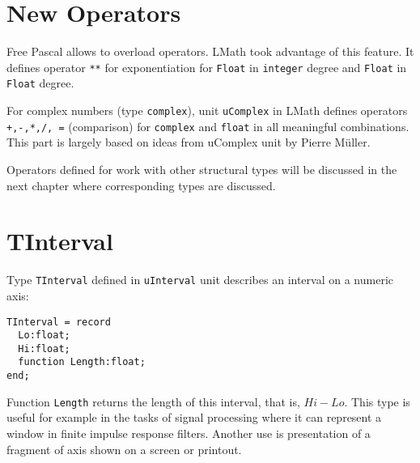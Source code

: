 \documentclass[12pt,a4paper,oneside]{article}
\newcommand{\code}[1]{\texttt{#1}}
\begin{document}
\section{New Operators}
Free Pascal allows to overload operators. LMath took advantage of this feature. It defines operator \code{**} for exponentiation for \code{Float} in \code{integer} degree and \code{Float} in \code{Float} degree.

For complex numbers (type \code{complex}), unit \code{uComplex} in LMath defines  operators \code{+,-,*,/, =} (comparison) for \code{complex} and \code{float} in all meaningful combinations. This part is largely based on ideas from uComplex unit by Pierre Müller.

Operators defined for work with other structural types will be discussed in the next chapter where corresponding types are discussed.

\section{TInterval}
Type \code{TInterval} defined in \code{uInterval} unit describes an interval on a numeric axis:
\begin{verbatim}
TInterval = record
  Lo:float;
  Hi:float;
  function Length:float;
end;
\end{verbatim}
Function \code{Length} returns the length of this interval, that is, $Hi-Lo$.
This type is useful for example in the tasks of signal processing where it can represent a window in finite impulse response filters. Another use is presentation of a fragment of axis shown on a screen or printout.
\end{document}
